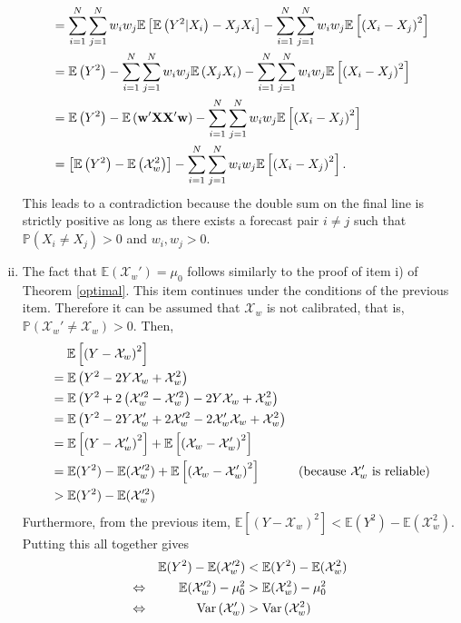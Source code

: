 \documentclass[11pt]{article}
\renewcommand{\P}{\mathbb{P}}
\newcommand{\E}{\mathbb{E}}
\theoremstyle{definition}
\theoremstyle{definition}
\def\w{{\bf w}}
\def\X{{\bf X}}
\def\P{{\mathbb P}}
\def\E{{\mathbb E}}
\def\Var{{\rm Var}\,}
\begin{document}
\begin{enumerate}[i)]
\begin{align*}
&= \sum_{i=1}^N\sum_{j=1}^Nw_iw_j \E\left[\E\left(Y^2|X_i\right) -X_jX_i\right]-\sum_{i=1}^N\sum_{j=1}^Nw_iw_j\E\left[\left(X_i-X_j\right)^2\right] \\
&=  \E\left(Y^2\right) - \sum_{i=1}^N\sum_{j=1}^Nw_iw_j \E\left(X_jX_i\right)-\sum_{i=1}^N\sum_{j=1}^Nw_iw_j\E\left[\left(X_i-X_j\right)^2\right] \\
&=  \E\left(Y^2\right) -  \E\left(\w'\X \X'\w\right)-\sum_{i=1}^N\sum_{j=1}^Nw_iw_j\E\left[\left(X_i-X_j\right)^2\right] \\
&= \left[\E\left(Y^2\right) -  \E\left(\mathcal{X}_w^2\right) \right]-\sum_{i=1}^N\sum_{j=1}^Nw_iw_j\E\left[\left(X_i-X_j\right)^2\right].
\end{align*}
This leads to a contradiction because the double sum on the final line is strictly positive as long as there exists a forecast pair $i \neq j$ such that $\P(X_i \neq X_j) > 0$ and $w_i, w_j > 0$. 

\item The fact that $\E(\mathcal{X}_w') = \mu_0$ follows similarly to the proof of item i) of Theorem \ref{optimal}. This item continues under the conditions of the previous item. Therefore it can be assumed that $\mathcal{X}_w$ is not calibrated, that is, $\P(\mathcal{X}_w' \neq \mathcal{X}_w) > 0$. Then,
\begin{align*}
&\hspace{1.3em}   \E \left[ \left( Y - \mathcal{X}_w\right)^2\right]\\
 &= \E \left( Y^2 - 2Y\mathcal{X}_w + \mathcal{X}_w^2\right)\\
&= \E \left( Y^2 + 2\left(\mathcal{X}_w'^2-\mathcal{X}_w'^2\right)- 2Y\mathcal{X}_w + \mathcal{X}_w^2\right)\\
&= \E \left( Y^2 -2Y\mathcal{X}_w'+2\mathcal{X}_w'^2- 2\mathcal{X}_w'\mathcal{X}_w + \mathcal{X}_w^2\right)\\
&= \E\left[\left(Y-\mathcal{X}_w'\right)^2\right] + \E\left[\left(\mathcal{X}_w-\mathcal{X}_w'\right)^2\right] \\
&= \E(Y^2)-\E(\mathcal{X}_w'^2) + \E\left[\left(\mathcal{X}_w-\mathcal{X}_w'\right)^2\right] & \text{(because $\mathcal{X}_w'$ is reliable)}\\
&> \E(Y^2)-\E(\mathcal{X}_w'^2) 
\end{align*}
Furthermore, from the previous item, $\E \left[ \left( Y - \mathcal{X}_w\right)^2\right] < \E(Y^2)-\E(\mathcal{X}_w^2)$. Putting this all together gives
\begin{align*}
&&\E(Y^2)-\E(\mathcal{X}_w'^2)  &< \E(Y^2)-\E(\mathcal{X}_w^2)\\
\Leftrightarrow && \E(\mathcal{X}_w'^2) - \mu_0^2  &> \E(\mathcal{X}_w^2) - \mu_0^2\\
\Leftrightarrow && \Var(\mathcal{X}_w')  &> \Var(\mathcal{X}_w^2)
\end{align*}



\end{enumerate}
\end{document}
